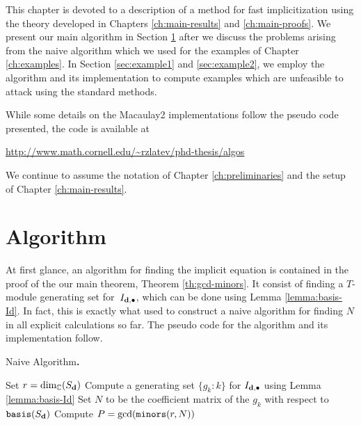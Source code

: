 \documentclass[fleqn,reqno]{amsart}
\newcounter{chapter}
\numberwithin{first}{chapter}
\begin{document}

This chapter is devoted to a description of a method for fast implicitization using
the theory developed in Chapters \ref{ch:main-results} and \ref{ch:main-proofs}.
We present our main algorithm in Section \ref{sec:algorithm} after we discuss
the problems arising from the naive algorithm
which we used for the examples of Chapter \ref{ch:examples}.
In Section \ref{sec:example1} and \ref{sec:example2},
we employ the algorithm and its implementation to compute examples which are unfeasible
to attack using the standard methods.

While some details on the Macaulay2 implementations follow the pseudo code presented,
the code is available at
\begin{center}
	\url{http://www.math.cornell.edu/~rzlatev/phd-thesis/algos}
\end{center}

\begin{paragraf*}
We continue to assume the notation of Chapter \ref{ch:preliminaries}
and the setup of Chapter \ref{ch:main-results}.
\end{paragraf*}



\section{Algorithm}
\label{sec:algorithm}

\begin{paragraf*}
At first glance, an algorithm for finding the implicit equation is contained in the proof
of the our main theorem, Theorem \ref{th:gcd-minors}.
It consist of finding a $T$-module generating set for~$I_{\mathbf d,\bullet}$,
which can be done using Lemma \ref{lemma:basis-Id}.
In fact, this is exactly what used to construct a naive algorithm for finding $N$
in all explicit calculations so far.
The pseudo code for the algorithm and its implementation follow.
\end{paragraf*}

\begin{algorithm} {\sc Naive Algorithm\bf.}
\label{algo:naive-algorithm}
\begin{algorithmic}
  \State Set $r=\dim_{\mathbb{C}}(S_{\mathbf d})$
  \State Compute a generating set $\{g_k:k\}$ for $I_{\mathbf d,\bullet}$
  	using Lemma \ref{lemma:basis-Id}
  \State Set $N$ to be the coefficient matrix of the $g_k$ with respect to $\mathop{\tt basis}(S_\mathbf d)$
  \State Compute $P=\gcd(\mathop{\tt minors}(r,N))$
\end{algorithmic}
\end{algorithm}
\end{document}
